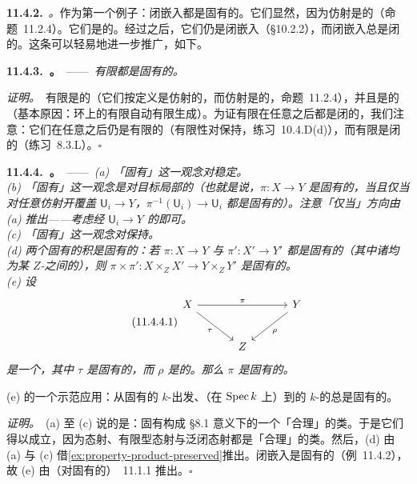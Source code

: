 \textbf{11.4.2.}\ \emph{\trhExample{}。}\quad 作为第一个例子：闭嵌入都是固有的。它们显然\trSeparated，因为仿射\trMorphism{}是\trSeparated{}的（命题~11.2.4）。它们是\trFiniteType{}的。经过\trBaseChange{}之后，它们仍是闭嵌入（\S10.2.2），而闭嵌入总是闭的。这条可以轻易地进一步推广，如下。

\textbf{11.4.3.\ \trhProposition{}。}\ ——\ \emph{有限\trMorphism{}都是固有的。}

\emph{证明。}\ 有限\trMorphism{}是\trSeparated{}的（它们按定义是仿射的，而仿射\trMorphism{}是\trSeparated{}的，命题~11.2.4），并且是\trFiniteType{}的（基本原因：环上的有限\trModule{}自动有限生成）。为证有限\trMorphism{}在任意\trBaseChange{}之后都是闭的，我们注意：它们在任意\trBaseChange{}之后仍是有限的（有限性对\trBaseChange{}保持，\mbox{练习~10.4.D(d)}），而有限\trMorphism{}是闭的（\mbox{练习~8.3.L}）。\hfill$\square$

\textbf{11.4.4.\ \trhProposition{}。}\ ——\ \emph{(a) 「固有\trMorphism」这一观念对\trBaseChange{}稳定。}\\
\emph{(b) 「固有\trMorphism」这一观念是对目标局部的（也就是说，$\pi\colon X\to Y$ 是固有的，当且仅当对任意仿射开覆盖 $\mathsf{U}_i\to Y$，$\pi^{-1}(\mathsf{U}_i)\to\mathsf{U}_i$ 都是固有的）。注意「仅当」方向由 (a) 推出——考虑经 $\mathsf{U}_i\to Y$ 的\trBaseChange{}即可。}\\
\emph{(c) 「固有\trMorphism」这一观念对\trComposition{}保持。}\\
\emph{(d) 两个固有\trMorphism{}的积是固有的：若 $\pi\colon X\to Y$ 与 $\pi'\colon X'\to Y'$ 都是固有的（其中诸\trMorphism{}均为某 $Z$-\trScheme{}之间的\trMorphism），则 $\pi\times\pi'\colon X\times_Z X'\to Y\times_Z Y'$ 是固有的。}\\
\emph{(e) 设}
\begin{equation*}\tag{11.4.4.1}\label{eq:properness-cancellation-triangle}
\begin{tikzcd}[row sep=2.4em, column sep=3.2em]
X \ar[rr, "\pi"] \ar[dr, "\tau"'] & & Y \ar[dl, "\rho"] \\
& Z &
\end{tikzcd}
\end{equation*}
\emph{是一个\trCommutativeDiagram，其中 $\tau$ 是固有的，而 $\rho$ 是\trSeparated{}的。那么 $\pi$ 是固有的。}

(e) 的一个示范应用：从固有的 $k$-\trScheme{}出发、（在 $\operatorname{Spec} k$ 上）到\trSeparated{}的 $k$-\trScheme{}的\trMorphism{}总是固有的。

\emph{证明。}\ (a) 至 (c) 说的是：固有\trMorphism{}构成 \S8.1 意义下的一个「合理」的\trMorphism{}类。于是它们得以成立，因为\trSeparated{}态射、有限型态射与泛闭态射都是「合理」的类。然后，(d) 由 (a) 与 (c) 借\cref{ex:property-product-preserved}推出。闭嵌入是固有的（例~11.4.2），故 (e) 由（对固有\trMorphism{}的）\trCancellationTheorem~11.1.1 推出。\hfill$\square$

